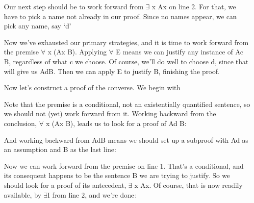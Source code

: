 Our next step should be to work forward from $\exists$ x Ax on line 2. For that, we have to pick a name not already in our proof. Since no names appear, we can pick any name, say ‘d’
\begin{fitchproof}
\open
{}
\open
{}
\ellipsesline
{}
\close
{}
\close
{}
\end{fitchproof}

Now we’ve exhausted our primary strategies, and it is time to work forward from the premise $\forall$ x (Ax \eif  B). Applying $\forall$ E means we can justify any instance of Ac \eif  B, regardless of what c we choose. Of course, we’ll do well to choose d, since that will give us Ad\eif B. Then we can apply \eif E to justify B, finishing the proof.
\begin{fitchproof}
\open
{}
\open
{}
\close
{}
\close
{}
\end{fitchproof}

Now let’s construct a proof of the converse. We begin with

\begin{fitchproof}
\ellipsesline
{}
\end{fitchproof}

Note that the premise is a conditional, not an existentially quantified sentence, so we should not (yet) work forward from it. Working backward from the conclusion, $\forall$ x (Ax \eif  B), leads us to look for a proof of Ad \eif  B:
\begin{fitchproof}
\ellipsesline
{}
\end{fitchproof}

And working backward from Ad\eif  B means we should set up a subproof with Ad as an assumption and B as the last line:
\begin{fitchproof}
\open
{}
\ellipsesline
{}
\close
{}
\end{fitchproof}

Now we can work forward from the premise on line 1. That’s a conditional, and its consequent happens to be the sentence B we are trying to justify. So we should look for a proof of its antecedent, $\exists$ x Ax. Of course, that is now readily available, by $\exists$I from line 2, and we’re done:
\begin{fitchproof}
\open
{}
\close
{}
\end{fitchproof}
